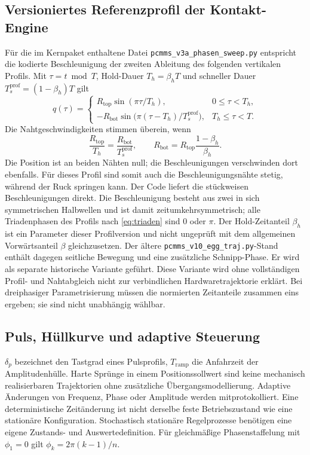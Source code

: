 \documentclass[11pt,a4paper]{article}
\begin{document}
\subsection{Versioniertes Referenzprofil der Kontakt-Engine}\label{sec:refprofil}
Für die im Kernpaket enthaltene Datei \texttt{pcmms\_v3a\_phasen\_sweep.py} entspricht die kodierte Beschleunigung der zweiten Ableitung des folgenden vertikalen Profils. Mit $\tau=t\bmod T$, Hold-Dauer $T_h=\beta_hT$ und schneller Dauer $T_s^{\mathrm{prof}}=(1-\beta_h)T$ gilt
\[
q(\tau)=\begin{cases}
R_{\mathrm{top}}\sin(\pi\tau/T_h),&0\le\tau<T_h,\\
-R_{\mathrm{bot}}\sin\bigl(\pi(\tau-T_h)/T_s^{\mathrm{prof}}\bigr),&T_h\le\tau<T.
\end{cases}
\]
Die Nahtgeschwindigkeiten stimmen überein, wenn
\[
\frac{R_{\mathrm{top}}}{T_h}=\frac{R_{\mathrm{bot}}}{T_s^{\mathrm{prof}}},\qquad
R_{\mathrm{bot}}=R_{\mathrm{top}}\frac{1-\beta_h}{\beta_h}.
\]
Die Position ist an beiden Nähten null; die Beschleunigungen verschwinden dort ebenfalls. Für dieses Profil sind somit auch die Beschleunigungsnähte stetig, während der Ruck springen kann. Der Code liefert die stückweisen Beschleunigungen direkt. Die Beschleunigung besteht aus zwei in sich symmetrischen Halbwellen und ist damit zeitumkehrsymmetrisch; alle Triadenphasen des Profils nach \eqref{eq:triaden} sind $0$ oder $\pi$. Der Hold-Zeitanteil $\beta_h$ ist ein Parameter dieser Profilversion und nicht ungeprüft mit dem allgemeinen Vorwärtsanteil $\beta$ gleichzusetzen.
Der ältere \texttt{pcmms\_v10\_egg\_traj.py}-Stand enthält dagegen seitliche Bewegung und eine zusätzliche Schnipp-Phase. Er wird als separate historische Variante geführt. Diese Variante wird ohne vollständigen Profil- und Nahtabgleich nicht zur verbindlichen Hardwaretrajektorie erklärt. Bei dreiphasiger Parametrisierung müssen die normierten Zeitanteile zusammen eins ergeben; sie sind nicht unabhängig wählbar.

\subsection{Puls, Hüllkurve und adaptive Steuerung}
$\delta_p$ bezeichnet den Tastgrad eines Pulsprofils, $T_{\mathrm{ramp}}$ die Anfahrzeit der Amplitudenhülle. Harte Sprünge in einem Positionssollwert sind keine mechanisch realisierbaren Trajektorien ohne zusätzliche Übergangsmodellierung.
Adaptive Änderungen von Frequenz, Phase oder Amplitude werden mitprotokolliert. Eine deterministische Zeitänderung ist nicht derselbe feste Betriebszustand wie eine stationäre Konfiguration. Stochastisch stationäre Regelprozesse benötigen eine eigene Zustands- und Auswertedefinition. Für gleichmäßige Phasenstaffelung mit $\phi_1=0$ gilt $\phi_k=2\pi(k-1)/n$.
\end{document}
